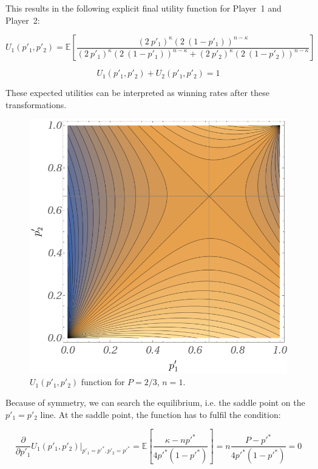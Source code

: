 \documentclass{article}
\theoremstyle{definition}
\begin{document}
This results in the following explicit final utility function for Player~1 and Player~2:

\begin{equation}
    U_1(p'_1,p'_2) = \mathbb{E} \left [  \frac{(2 \ p'_1)^\kappa (2 \ (1-p'_1))^{n-\kappa}}{(2 \ p'_1)^\kappa (2 \ (1-p'_1))^{n-\kappa} + (2 \ p'_2)^\kappa (2 \ (1-p'_2))^{n-\kappa}}  \right ]
\end{equation}

\begin{equation}
    U_1(p'_1,p'_2) + U_2(p'_1,p'_2) = 1
\end{equation}

These expected utilities can be interpreted as winning rates after these transformations.

\begin{figure}[H]
    \centering
    \includegraphics[width=12 cm]{img/Contest_Up1p2.png}
    \caption{$U_1(p'_1,p'_2)$ function for $P=2/3$, $n=1$.}
    \label{fig:Contest_Up1p2}
\end{figure}

Because of symmetry, we can search the equilibrium, i.e. the saddle point on the $p'_1 = p'_2$ line.
At the saddle point, the function has to fulfil the condition:

\begin{equation}
    \frac{\partial}{\partial p'_1} U_1(p'_1,p'_2) |_{p'_1 = p'^*, p'_2 = p'^*} = \mathbb{E} \left [ \frac{\kappa - n p'^*}{4 p'^* (1-p'^*)} \right ] = n \frac{P-p'^*}{4 p'^* (1-p'^*)} =
    0
\end{equation}
\end{document}
